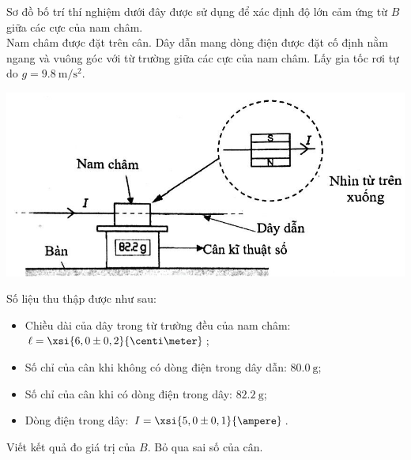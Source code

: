 \begin{ex}
	Sơ đồ bố trí thí nghiệm dưới đây được sử dụng để xác định độ lớn cảm ứng từ $B$ giữa các cực của nam châm.\\
	Nam châm được đặt trên cân. Dây dẫn mang dòng điện được đặt cố định nằm ngang và vuông góc với từ trường giữa các cực của nam châm. Lấy gia tốc rơi tự do $g=\SI{9.8}{\meter/\second^2}$.
	\begin{center}
		\includegraphics[width=0.6\linewidth]{figs/VN12-Y24-PH-SYL-018P-9}
	\end{center}
	Số liệu thu thập được như sau:
	\begin{itemize}
		\item Chiều dài của dây trong từ trường đều của nam châm: $\ell=\xsi{6,0\pm 0,2}{\centi\meter}$;
		\item Số chỉ của cân khi không có dòng điện trong dây dẫn: $\SI{80,0}{\gram}$;
		\item Số chỉ của cân khi có dòng điện trong dây: $\SI{82.2}{\gram}$;
		\item Dòng điện trong dây: $I=\xsi{5,0\pm0,1}{\ampere}$.
	\end{itemize}
	Viết kết quả đo giá trị của $B$. Bỏ qua sai số của cân.
\end{ex}